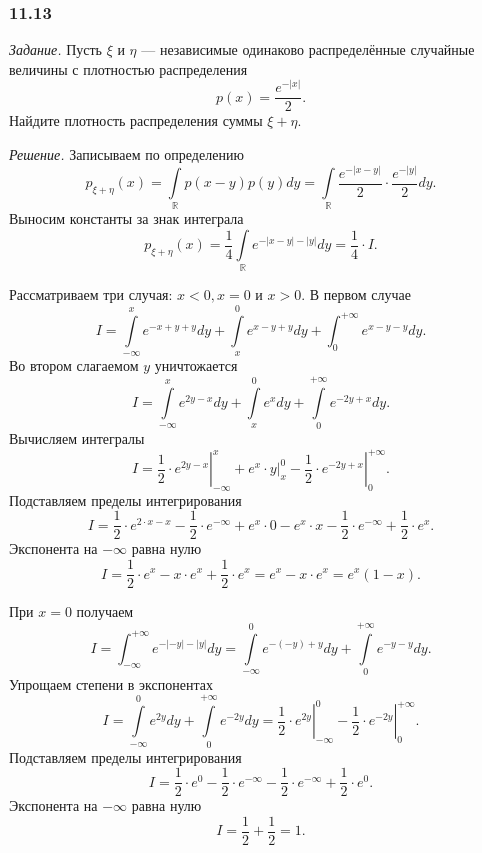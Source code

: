 \subsubsection*{11.13}

\textit{Задание.} Пусть $ \xi $ и $ \eta $ --- независимые одинаково распределённые случайные величины с плотностью распределения
$$p \left( x \right) =
\frac{e^{- \left| x \right| }}{2}.$$
Найдите плотность распределения суммы $ \xi + \eta $.

\textit{Решение.} Записываем по определению
$$p_{ \xi + \eta } \left( x \right) =
\int \limits_{ \mathbb{R}} p \left( x-y \right) p \left( y \right) dy =
\int \limits_{ \mathbb{R}} \frac{e^{- \left| x-y \right| }}{2} \cdot \frac{e^{- \left| y \right| }}{2} dy.$$
Выносим константы за знак интеграла
$$p_{ \xi + \eta } \left( x \right) =
\frac{1}{4} \int \limits_{ \mathbb{R}} e^{- \left| x-y \right| - \left| y \right| } dy =
\frac{1}{4} \cdot I.$$

Рассматриваем три случая: $x < 0, x = 0$ и $x > 0$.
В первом случае
$$I =
\int \limits_{- \infty }^x e^{-x+y+y} dy + \int \limits_x^0 e^{x-y+y} dy + \int_0^{+ \infty } e^{x-y-y} dy.$$
Во втором слагаемом $y$ уничтожается
$$I =
\int \limits_{- \infty }^x e^{2y-x} dy + \int \limits_x^0 e^x dy + \int \limits_0^{+ \infty } e^{-2y+x} dy.$$
Вычисляем интегралы
$$I =
\left. \frac{1}{2} \cdot e^{2y-x} \right|_{- \infty }^x + \left. e^x \cdot y \right|_x^0 - \left. \frac{1}{2} \cdot e^{-2y+x} \right|_0^{+ \infty }.$$
Подставляем пределы интегрирования
$$I =
\frac{1}{2} \cdot e^{2 \cdot x - x} - \frac{1}{2} \cdot e^{- \infty } + e^x \cdot 0 - e^x \cdot x - \frac{1}{2} \cdot e^{- \infty } + \frac{1}{2} \cdot e^x.$$
Экспонента на $- \infty $ равна нулю
$$I =
\frac{1}{2} \cdot e^x - x \cdot e^x + \frac{1}{2} \cdot e^x =
e^x - x \cdot e^x =
e^x \left( 1 - x \right).$$

При $x = 0$ получаем
$$I =
\int_{- \infty }^{+ \infty } e^{- \left| -y \right| - \left| y \right| } dy =
\int \limits_{- \infty }^0 e^{- \left( -y \right) + y} dy + \int \limits_0^{+ \infty } e^{-y-y} dy.$$
Упрощаем степени в экспонентах
$$I =
\int \limits_{- \infty }^0 e^{2y} dy + \int \limits_0^{+ \infty } e^{-2y} dy =
\left. \frac{1}{2} \cdot e^{2y} \right|_{- \infty }^0 - \left. \frac{1}{2} \cdot e^{-2y} \right|_0^{+ \infty }.$$
Подставляем пределы интегрирования
$$I =
\frac{1}{2} \cdot e^0 - \frac{1}{2} \cdot e^{- \infty } - \frac{1}{2} \cdot e^{- \infty } + \frac{1}{2} \cdot e^0.$$
Экспонента на $- \infty $ равна нулю
$$I =
\frac{1}{2} + \frac{1}{2} =
1.$$

